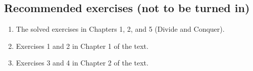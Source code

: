 \documentclass[11pt]{article}
\begin{document}
\subsection*{Recommended exercises (not to be turned in)}
\begin{enumerate}
\item The solved exercises in Chapters 1, 2, and 5 (Divide and Conquer).
\item Exercises 1 and 2 in Chapter 1 of the text.
\item Exercises 3 and 4 in Chapter 2 of the text.
\end{enumerate} 
\end{document}
